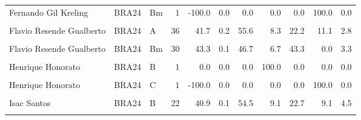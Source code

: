 \documentclass[
]{book}
\begin{document}
\begin{table}[!h]
{\begin{tabular}[t]{lllrrrrrrrr}
Fernando Gil Kreling & BRA24 & Bm & 1 & -100.0 & 0.0 & 0.0 & 0.0 & 0.0 & 100.0 & 0.0\\
\cellcolor{gray!10}{Fernando Gil Kreling} & \cellcolor{gray!10}{BRA24} & \cellcolor{gray!10}{C} & \cellcolor{gray!10}{4} & \cellcolor{gray!10}{0.0} & \cellcolor{gray!10}{0.0} & \cellcolor{gray!10}{0.0} & \cellcolor{gray!10}{25.0} & \cellcolor{gray!10}{75.0} & \cellcolor{gray!10}{0.0} & \cellcolor{gray!10}{0.0}\\
Flavio Resende Gualberto & BRA24 & A & 36 & 41.7 & 0.2 & 55.6 & 8.3 & 22.2 & 11.1 & 2.8\\
\cellcolor{gray!10}{Flavio Resende Gualberto} & \cellcolor{gray!10}{BRA24} & \cellcolor{gray!10}{B} & \cellcolor{gray!10}{41} & \cellcolor{gray!10}{56.1} & \cellcolor{gray!10}{0.3} & \cellcolor{gray!10}{63.4} & \cellcolor{gray!10}{12.2} & \cellcolor{gray!10}{17.1} & \cellcolor{gray!10}{2.4} & \cellcolor{gray!10}{4.9}\\
\addlinespace
Flavio Resende Gualberto & BRA24 & Bm & 30 & 43.3 & 0.1 & 46.7 & 6.7 & 43.3 & 0.0 & 3.3\\
\cellcolor{gray!10}{Flavio Resende Gualberto} & \cellcolor{gray!10}{BRA24} & \cellcolor{gray!10}{C} & \cellcolor{gray!10}{1} & \cellcolor{gray!10}{0.0} & \cellcolor{gray!10}{0.0} & \cellcolor{gray!10}{0.0} & \cellcolor{gray!10}{0.0} & \cellcolor{gray!10}{100.0} & \cellcolor{gray!10}{0.0} & \cellcolor{gray!10}{0.0}\\
Henrique Honorato & BRA24 & B & 1 & 0.0 & 0.0 & 0.0 & 100.0 & 0.0 & 0.0 & 0.0\\
\cellcolor{gray!10}{Henrique Honorato} & \cellcolor{gray!10}{BRA24} & \cellcolor{gray!10}{Bm} & \cellcolor{gray!10}{1} & \cellcolor{gray!10}{100.0} & \cellcolor{gray!10}{0.0} & \cellcolor{gray!10}{100.0} & \cellcolor{gray!10}{0.0} & \cellcolor{gray!10}{0.0} & \cellcolor{gray!10}{0.0} & \cellcolor{gray!10}{0.0}\\
Henrique Honorato & BRA24 & C & 1 & -100.0 & 0.0 & 0.0 & 0.0 & 0.0 & 100.0 & 0.0\\
\addlinespace
\cellcolor{gray!10}{Isac Santos} & \cellcolor{gray!10}{BRA24} & \cellcolor{gray!10}{A} & \cellcolor{gray!10}{14} & \cellcolor{gray!10}{57.1} & \cellcolor{gray!10}{0.1} & \cellcolor{gray!10}{64.3} & \cellcolor{gray!10}{14.3} & \cellcolor{gray!10}{14.3} & \cellcolor{gray!10}{0.0} & \cellcolor{gray!10}{7.1}\\
Isac Santos & BRA24 & B & 22 & 40.9 & 0.1 & 54.5 & 9.1 & 22.7 & 9.1 & 4.5\\
\cellcolor{gray!10}{Isac Santos} & \cellcolor{gray!10}{BRA24} & \cellcolor{gray!10}{Bm} & \cellcolor{gray!10}{12} & \cellcolor{gray!10}{25.0} & \cellcolor{gray!10}{0.1} & \cellcolor{gray!10}{50.0} & \cellcolor{gray!10}{0.0} & \cellcolor{gray!10}{25.0} & \cellcolor{gray!10}{25.0} & \cellcolor{gray!10}{0.0}\\

\end{tabular}}
\end{table}
\end{document}
